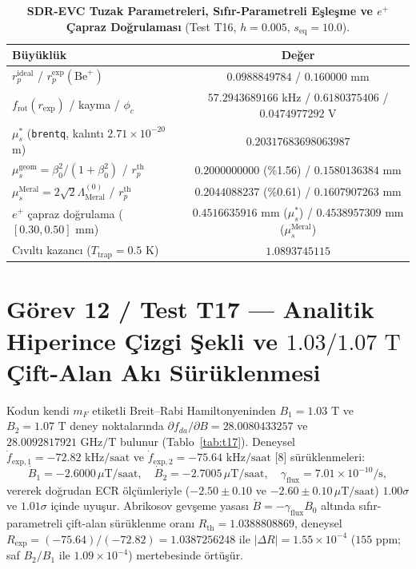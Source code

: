 \documentclass[12pt,a4paper]{article}
\begin{document}
\begin{table}[!htbp]
\centering
\footnotesize
\setlength{\tabcolsep}{3pt}
\caption{\textbf{SDR-EVC Tuzak Parametreleri, Sıfır-Parametreli Eşleşme ve $e^+$ Çapraz Doğrulaması} (Test T16, $h=0.005$, $s_{\mathrm{eq}}=10.0$).}
\label{tab:t16}
\vspace{0.1cm}
\begin{tabular}{@{}l|c@{}}
\hline
Büyüklük & Değer \\
\hline
$r_p^{\mathrm{ideal}}$ / $r_p^{\mathrm{exp}}(\mathrm{Be}^+)$ & $0.0988849784$ / $0.160000$ mm \\
$f_{\mathrm{rot}}(r_{\mathrm{exp}})$ / kayma / $\phi_c$ & $57.2943689166$ kHz / $0.6180375406$ / $0.0474977292$ V \\
$\mu_s^*$ (\texttt{brentq}, kalıntı $2.71\times10^{-20}$ m) & $0.20317683698063987$ \\
$\mu_s^{\mathrm{geom}} = \beta_0^2/(1+\beta_0^2)$ / $r_p^{\mathrm{th}}$ & $0.2000000000$ (\%1.56) / $0.1580136384$ mm \\
$\mu_s^{\mathrm{Meral}} = 2\sqrt{2}\Lambda_{\mathrm{Meral}}^{(0)}$ / $r_p^{\mathrm{th}}$ & $0.2044088237$ (\%0.61) / $0.1607907263$ mm \\
$e^+$ çapraz doğrulama ($[0.30, 0.50]$ mm) & $0.4516635916$ mm ($\mu_s^*$) / $0.4538957309$ mm ($\mu_s^{\mathrm{Meral}}$) \\
Cıvıltı kazancı ($T_{\mathrm{trap}}=0.5$ K) & $1.0893745115$ \\
\hline
\end{tabular}
\end{table}

\section{Görev 12 / Test T17 --- Analitik Hiperince Çizgi Şekli ve $1.03/1.07\text{ T}$ Çift-Alan Akı Sürüklenmesi}

Kodun kendi $m_F$ etiketli Breit--Rabi Hamiltonyeninden $B_1=1.03\text{ T}$ ve $B_2=1.07\text{ T}$ deney noktalarında $\partial f_{da}/\partial B = 28.0080433257$ ve $28.0092817921\text{ GHz/T}$ bulunur (Tablo~\ref{tab:t17}). Deneysel $\dot{f}_{\mathrm{exp},1}=-72.82\text{ kHz/saat}$ ve $\dot{f}_{\mathrm{exp},2}=-75.64\text{ kHz/saat}$ [8] sürüklenmeleri:
\begin{equation}
\dot{B}_1 = -2.6000\,\mu\text{T/saat}, \quad \dot{B}_2 = -2.7005\,\mu\text{T/saat}, \quad \gamma_{\mathrm{flux}} = 7.01\times 10^{-10}\text{/s},
\label{eq:fluxdrift}
\end{equation}
vererek doğrudan ECR ölçümleriyle ($-2.50\pm0.10$ ve $-2.60\pm0.10\,\mu\text{T/saat}$) $1.00\sigma$ ve $1.01\sigma$ içinde uyuşur. Abrikosov gevşeme yasası $\dot{B}=-\gamma_{\mathrm{flux}}B_0$ altında sıfır-parametreli çift-alan sürüklenme oranı $R_{\mathrm{th}} = 1.0388808869$, deneysel $R_{\mathrm{exp}} = (-75.64)/(-72.82) = 1.0387256248$ ile $\vert{}\Delta R\vert{} = 1.55\times 10^{-4}$ ($155\text{ ppm}$; saf $B_2/B_1$ ile $1.09\times 10^{-4}$) mertebesinde örtüşür.
\end{document}
